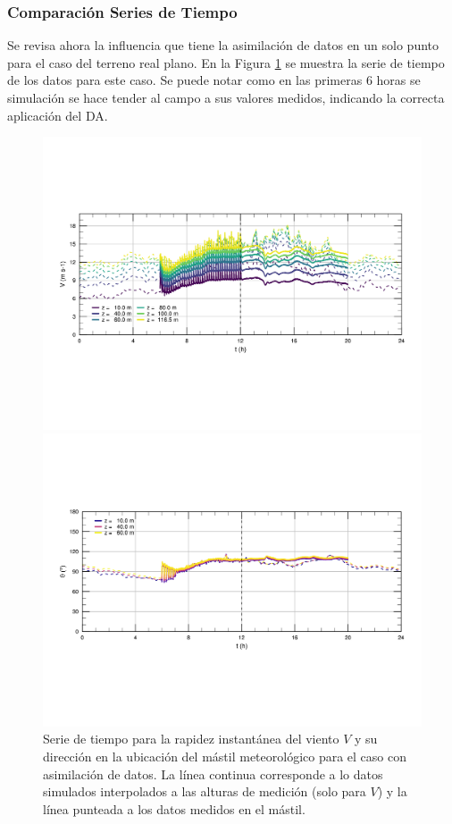 \subsubsection{Comparación Series de Tiempo}
Se revisa ahora la influencia que tiene la asimilación de datos en un solo punto para el caso del terreno real plano. En la Figura \ref{fig:06_hov_da_ts} se muestra la serie de tiempo de los datos para este caso. Se puede notar como en las primeras 6 horas se simulación se hace tender al campo a sus valores medidos, indicando la correcta aplicación del DA. 
\begin{figure}[H]
	\centering
	\includegraphics[width=1\linewidth,trim={9mm 63mm 10mm 55mm},clip]{Imagenes/06/hov_da/ts_v}%
	
	\includegraphics[width=1\linewidth,trim={12mm 55mm 10mm 55mm},clip]{Imagenes/06/hov_da/ts_o}%
	\caption{Serie de tiempo para la rapidez instantánea del viento $V$ y su dirección en la ubicación del mástil meteorológico para el caso con asimilación de datos. La línea continua corresponde a lo datos simulados interpolados a las alturas de medición (solo para $V$) y la línea punteada a los datos medidos en el mástil.}
	\label{fig:06_hov_da_ts}
\end{figure}
